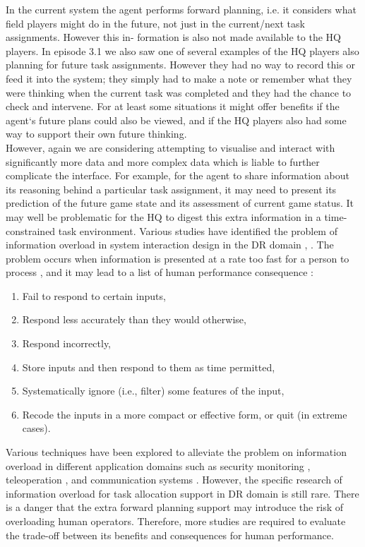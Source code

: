 In the current system the agent performs forward planning, i.e. it considers what field players might do in the future, not just in the current/next task assignments. However this in- formation is also not made available to the HQ players. In episode 3.1 we also saw one of several examples of the HQ players also planning for future task assignments. However they had no way to record this or feed it into the system; they simply had to make a note or remember what they were thinking when the current task was completed and they had the chance to check and intervene. For at least some situations it might offer benefits if the agent`s future plans could also be viewed, and if the HQ players also had some way to support their own future thinking.\\

However, again we are considering attempting to visualise and interact with significantly more data and more complex data which is liable to further complicate the interface. For example, for the agent to share information about its reasoning behind a particular task assignment, it may need to present its prediction of the future game state and its assessment of current game status. It may well be problematic for the HQ to digest this extra information in a time-constrained task environment. Various studies have identified the problem of information overload in system interaction design in the \ac{DR} domain \cite{Carver2007}, \cite{Turoff2004a}. The problem occurs when information is presented at a rate too fast for a person to process \cite{Hiltz1985}, and it may lead to a list of human performance consequence \cite{Hiltz1985}:\\

\begin{enumerate}
\item Fail to respond to certain inputs,
\item Respond less accurately than they would otherwise,
\item Respond incorrectly,
\item Store inputs and then respond to them as time permitted,
\item Systematically ignore (i.e., filter) some features of the input,
\item Recode the inputs in a more compact or effective form, or quit (in extreme cases).
\end{enumerate}

Various techniques have been explored to alleviate the problem on information overload in different application domains such as security monitoring \cite{Conti2006}, teleoperation \cite{Kadous2006}, and communication systems \cite{Hiltz1985}. However, the specific research of information overload for task allocation support in DR domain is still rare. There is a danger that the extra forward planning support may introduce the risk of overloading human operators. Therefore, more studies are required to evaluate the trade-off between its benefits and consequences for human performance.\\



